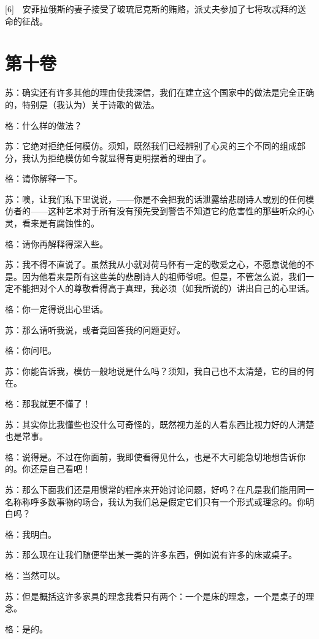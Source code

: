 \documentclass[12pt,oneside]{book}
\begin{document}
[6]　安菲拉俄斯的妻子接受了玻琉尼克斯的贿赂，派丈夫参加了七将攻忒拜的送命的征战。





\chapter{第十卷}

苏：确实还有许多其他的理由使我深信，我们在建立这个国家中的做法是完全正确的，特别是（我认为）关于诗歌的做法。

格：什么样的做法？

苏：它绝对拒绝任何模仿。须知，既然我们已经辨别了心灵的三个不同的组成部分，我认为拒绝模仿如今就显得有更明摆着的理由了。

格：请你解释一下。

苏：噢，让我们私下里说说，——你是不会把我的话泄露给悲剧诗人或别的任何模仿者的——这种艺术对于所有没有预先受到警告不知道它的危害性的那些听众的心灵，看来是有腐蚀性的。

格：请你再解释得深入些。

苏：我不得不直说了。虽然我从小就对荷马怀有一定的敬爱之心，不愿意说他的不是。因为他看来是所有这些美的悲剧诗人的祖师爷呢。但是，不管怎么说，我们一定不能把对个人的尊敬看得高于真理，我必须（如我所说的）讲出自己的心里话。

格：你一定得说出心里话。

苏：那么请听我说，或者竟回答我的问题更好。

格：你问吧。

苏：你能告诉我，模仿一般地说是什么吗？须知，我自己也不太清楚，它的目的何在。

格：那我就更不懂了！

苏：其实你比我懂些也没什么可奇怪的，既然视力差的人看东西比视力好的人清楚也是常事。

格：说得是。不过在你面前，我即使看得见什么，也是不大可能急切地想告诉你的。你还是自己看吧！

苏：那么下面我们还是用惯常的程序来开始讨论问题，好吗？在凡是我们能用同一名称称呼多数事物的场合，我认为我们总是假定它们只有一个形式或理念的。你明白吗？

格：我明白。

苏：那么现在让我们随便举出某一类的许多东西，例如说有许多的床或桌子。

格：当然可以。

苏：但是概括这许多家具的理念我看只有两个：一个是床的理念，一个是桌子的理念。

格：是的。
\end{document}
